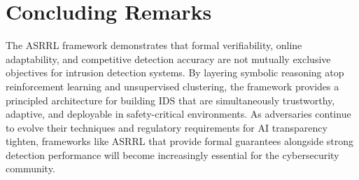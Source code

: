 \documentclass[12pt, letterpaper, oneside]{report}
\newcommand{\ASRRL}{\textsc{ASRRL}}
\begin{document}
\section{Concluding Remarks}

The \ASRRL{} framework demonstrates that formal verifiability, online adaptability, and competitive detection accuracy are not mutually exclusive objectives for intrusion detection systems. By layering symbolic reasoning atop reinforcement learning and unsupervised clustering, the framework provides a principled architecture for building IDS that are simultaneously trustworthy, adaptive, and deployable in safety-critical environments. As adversaries continue to evolve their techniques and regulatory requirements for AI transparency tighten, frameworks like \ASRRL{} that provide formal guarantees alongside strong detection performance will become increasingly essential for the cybersecurity community.


\end{document}
